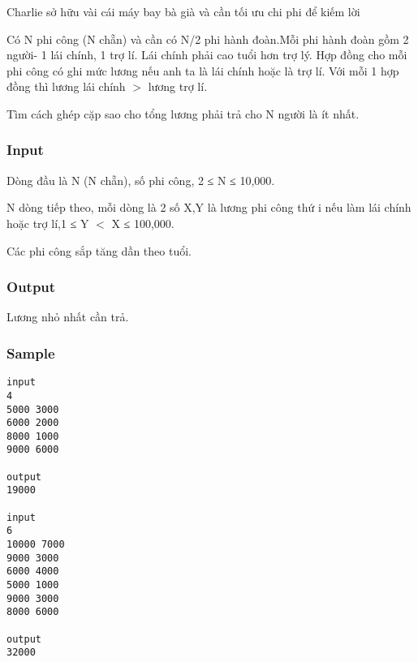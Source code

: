



   Charlie sở hữu vài cái máy bay bà già và cần tối ưu chi phi để kiếm lời  

   Có N phi công (N chẵn) và cần có N/2 phi hành đoàn.Mỗi phi hành đoàn gồm 2 người- 1 lái chính, 1 trợ lí. Lái chính phải cao tuổi hơn trợ lý. Hợp đồng cho mỗi phi công có ghi mức lương nếu anh ta là lái chính hoặc là trợ lí.  Với mỗi 1 hợp đồng thì lương lái chính $>$ lương trợ lí.  

   Tìm cách ghép cặp sao cho tổng lương phải trả cho N người là ít nhất.  



\subsubsection{   Input  }



   Dòng đầu là N (N chẵn), số phi công, 2 ≤ N ≤ 10,000.  

   N dòng tiếp theo, mỗi dòng là 2 số X,Y là lương phi công thứ i nếu làm lái chính hoặc trợ lí,1 ≤ Y $<$ X ≤ 100,000.  

   Các phi công sắp tăng dần theo tuổi.  



\subsubsection{   Output  }



   Lương nhỏ nhất cần trả.  



\subsubsection{   Sample  }
\begin{verbatim}
input 
4 
5000 3000 
6000 2000 
8000 1000 
9000 6000 
 
output 
19000 

input 
6 
10000 7000 
9000 3000 
6000 4000 
5000 1000 
9000 3000 
8000 6000 
 
output 
32000 


\end{verbatim}